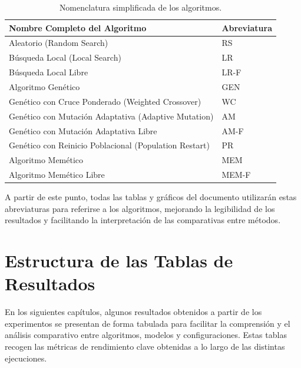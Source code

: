 \begin{table}[htp]
    \centering
    \begin{tabular}{ll}
        \toprule
        \textbf{Nombre Completo del Algoritmo}                 & \textbf{Abreviatura} \\
        \midrule
        Aleatorio (Random Search)                              & RS                   \\
        Búsqueda Local (Local Search)                          & LR                   \\
        Búsqueda Local Libre                                   & LR-F                 \\
        Algoritmo Genético                                     & GEN                  \\
        Genético con Cruce Ponderado (Weighted Crossover)      & WC                   \\
        Genético con Mutación Adaptativa (Adaptive Mutation)   & AM                   \\
        Genético con Mutación Adaptativa Libre                 & AM-F                 \\
        Genético con Reinicio Poblacional (Population Restart) & PR                   \\
        Algoritmo Memético                                     & MEM                  \\
        Algoritmo Memético Libre                               & MEM-F                \\
        \bottomrule
    \end{tabular}
    \caption{Nomenclatura simplificada de los algoritmos.}
    \label{tab:nombres-algoritmos}
\end{table}

A partir de este punto, todas las tablas y gráficos del documento utilizarán estas abreviaturas para referirse a los algoritmos,
mejorando la legibilidad de los resultados y facilitando la interpretación de las comparativas entre métodos.


\section{Estructura de las Tablas de Resultados}\label{subsec:estructura-tablas}
En los siguientes capítulos, algunos resultados obtenidos a partir de los experimentos se presentan de forma tabulada para facilitar la
comprensión y el análisis comparativo entre algoritmos, modelos y configuraciones.
Estas tablas recogen las métricas de rendimiento clave obtenidas a lo largo de las distintas ejecuciones.

